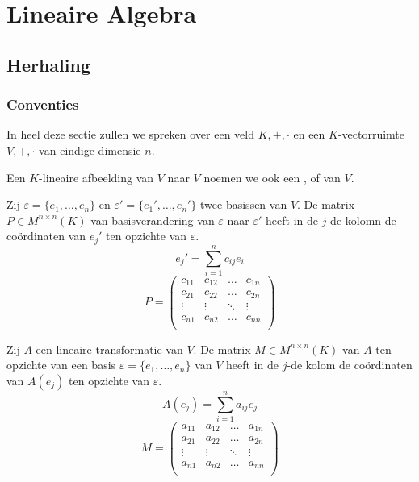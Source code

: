 \documentclass[main.tex]{subfiles}
\begin{document}
\chapter{Lineaire Algebra}
\label{cha:lineaire-algebra}

\section{Herhaling}
\label{sec:herhaling}

\subsection{Conventies}
\label{sec:conventies}


In heel deze sectie zullen we spreken over een veld $K,+,\cdot$ en een $K$-vectorruimte $V,+,\cdot$ van eindige dimensie $n$.

\begin{de}
  Een $K$-lineaire afbeelding van $V$ naar $V$ noemen we ook een ,  of  van $V$.
\end{de}

\begin{st}
  Zij $\varepsilon = \{e_{1},\dotsc,e_{n}\}$ en $\varepsilon'= \{ e_{1}',\dotsc,e_{n}'\}$ twee basissen van $V$.
  De matrix $P \in M^{n\times n}(K)$ van basisverandering van $\varepsilon$ naar $\varepsilon'$ heeft in de $j$-de kolomn de co\"ordinaten van $e_{j}'$ ten opzichte van $\varepsilon$.
  \[ e_{j}' = \sum_{i=1}^{n}c_{ij}e_{i} \]
  \[
  P = 
  \begin{pmatrix}
    c_{11} & c_{12} & \hdots & c_{1n}\\
    c_{21} & c_{22} & \hdots & c_{2n}\\
    \vdots & \vdots & \ddots & \vdots\\
    c_{n1} & c_{n2} & \hdots & c_{nn}\\
  \end{pmatrix}
  \]
\end{st}

\begin{st}
  Zij $A$ een lineaire transformatie van $V$.
  De matrix $M\in M^{n\times n}(K)$ van $A$ ten opzichte van een basis $\varepsilon = \{e_{1},\dotsc,e_{n}\}$ van $V$ heeft in de $j$-de kolom de co\"ordinaten van $A(e_{j})$ ten opzichte van $\varepsilon$.
  \[ A(e_{j}) = \sum_{i=1}^{n}a_{ij}e_{j} \]
  \[ 
  M = 
  \begin{pmatrix}
    a_{11} & a_{12} & \hdots & a_{1n}\\
    a_{21} & a_{22} & \hdots & a_{2n}\\
    \vdots & \vdots & \ddots & \vdots\\
    a_{n1} & a_{n2} & \hdots & a_{nn}\\
  \end{pmatrix}
  \]
\end{st}
\end{document}
